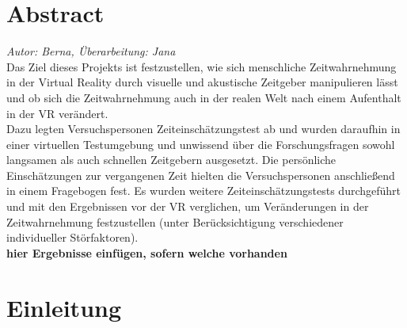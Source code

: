 \documentclass{Paper}
\begin{document}
\maketitle


\tableofcontents
\clearpage




\section*{Abstract}
	\textit{Autor: Berna, Überarbeitung: Jana}\\
Das Ziel dieses Projekts ist festzustellen, wie sich menschliche Zeitwahrnehmung in der Virtual Reality durch visuelle und akustische Zeitgeber manipulieren lässt und ob sich die Zeitwahrnehmung auch in der realen Welt nach einem Aufenthalt in der VR verändert.\\
Dazu legten Versuchspersonen Zeiteinschätzungstest ab und wurden daraufhin in einer virtuellen Testumgebung und unwissend über die Forschungsfragen sowohl langsamen als auch schnellen Zeitgebern ausgesetzt. 
Die persönliche Einschätzungen zur vergangenen Zeit hielten die Versuchspersonen anschließend in einem Fragebogen fest. Es wurden weitere Zeiteinschätzungstests durchgeführt und mit den Ergebnissen vor der VR verglichen, um Veränderungen in der Zeitwahrnehmung festzustellen (unter Berücksichtigung verschiedener individueller Störfaktoren).\\
\textbf{hier Ergebnisse einfügen, sofern welche vorhanden}

\section{Einleitung}
\end{document}
